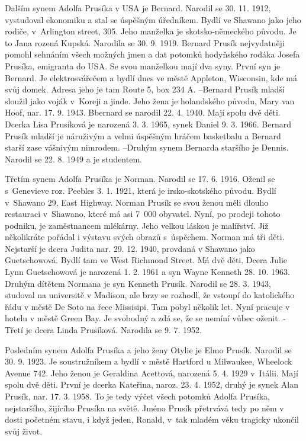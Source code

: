 \documentclass[../dejiny-rodu-prusiku.tex]{subfiles}
\begin{document}
Další­m synem Adolfa Prusí­ka v USA je Bernard. Narodil se 30. 11. 1912, vystudoval ekonomiku a stal se úspěšným úředníkem. Bydlí ve Shawano jako jeho rodiče, v Arlington street, 305. Jeho manželka je skotsko-německého původu. Je to Jana rozená Kupská. Narodila se 30. 9. 1919. Bernard Prusík nejvydatněji pomohl sehnáním všech možných jmen
a dat potomků hodyňského rodáka Josefa Prusíka, emigranta do USA. Se svou manželkou mají dva syny. První syn je Bernard. Je elektrosvářečem a bydlí dnes ve městě Appleton, Wisconsin, kde má svůj domek. Adresa jeho je tam Route 5, box 234 A. –Bernard Prusík mladší sloužil jako voják v Koreji a jinde. Jeho žena je holandského původu, Mary van Hoof, nar. 17. 9. 1943. Bbernard se narodil 22. 4. 1940. Mají spolu dvě děti. Dcerka Lisa Prusíková je narozená 3. 3. 1965, synek Daniel  9. 3. 1966. Bernard Prusík mladší je náruživým a velmi úspěšným hráčem basketbalu a Bernard starší zase vášnivým nimrodem.  –Druhým synem Bernarda staršího je Dennis. Narodil se 22. 8. 1949 a je studentem.

Třetím synem Adolfa Prusíka je Norman. Narodil se 17. 6. 1916. Oženil se s Genevieve roz. Peebles 3. 1. 1921, která je irsko-skotského původu. Bydlí v Shawano 29, East Highway. Norman Prusík se svou ženou měli dlouho restauraci v Shawano, které má asi 7 000 obyvatel. Nyní, po prodeji tohoto podniku, je zaměstnancem mlékárny. Jeho velkou láskou je malířství. Již několikráte pořádal i výstavu svých obrazů s úspěchem. Norman má tři děti. Nejstarší je dcera Judita nar. 29. 12. 1940, provdaná v Shawano jako Guetschowová. Bydlí tam ve West Richmond Street. Má dvě děti. Dcera Julie Lynn Guetscho­wová je narozená 1. 2. 1961 a syn Wayne Kenneth 28. 10. 1963. Druhým dítětem Normana je syn Kenneth Prusík. Narodil se 28. 3. 1943, studoval na universitě v Madison, ale brzy se rozhodl, že vstoupí do katolického řádu v městě De Soto na řece Missisipi. Tam pobyl několik let. Nyní pra­cuje v hotelu v městě Green Bay. Je svobodný a zdá se, že se nemíní vůbec oženit. - Třetí je dcera Linda Prusíková. Narodila se 9. 7. 1952.

Posledním synem Adolfa Prusíka a jeho ženy Otylie je Elmo Prusík. Narodil se 30. 9. 1923. Je soustružníkem a bydlí v městě Hartford u Milwaukee, Wheelock Avenue 742. Jeho ženou je Geraldina Acettová, narozená 5. 4. 1929 v Itálii. Mají spolu dvě děti. První je dcerka Kateřina, naroz. 23. 4. 1952, druhý je synek Alan Prusík, nar. 17. 3. 1958. To je tedy výčet všech potomků Adolfa Prusíka, nejstaršího, žijícího Prusíka na světě. Jméno Prusík přetrvává tedy po něm v dosti početném stavu, i když jeden, Ronald, v tak mladém věku tragicky ukončil svůj život.
\end{document}
